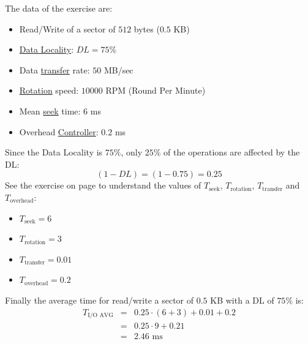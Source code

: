 \begin{exercisebox}
    The data of the exercise are:
    \begin{itemize}
        \item Read/Write of a sector of $512$ bytes ($0.5$ KB)
        \item \underline{Data Locality}: $DL = 75\%$
        \item Data \underline{transfer} rate: $50$ MB/sec
        \item \underline{Rotation} speed: $10000$ RPM (Round Per Minute)
        \item Mean \underline{seek} time: $6$ ms
        \item Overhead \underline{Controller}: $0.2$ ms
    \end{itemize}
    Since the Data Locality is $75\%$, only $25\%$ of the operations are affected by the DL:
    \begin{equation*}
        \left(1-DL\right) = \left(1 - 0.75\right) = 0.25
    \end{equation*}
    See the exercise on page \pageref{exercise: mean service time of an I/O operation} to understand the values of $T_{\text{seek}}$, $T_{\text{rotation}}$, $T_{\text{transfer}}$ and $T_{\text{overhead}}$:
    \begin{itemize}
        \item $T_{\text{seek}} = 6$
        \item $T_{\text{rotation}} = 3$
        \item $T_{\text{transfer}} = 0.01$
        \item $T_{\text{overhead}} = 0.2$
    \end{itemize}
    Finally the average time for read/write a sector of $0.5$ KB with a DL of $75\%$ is:
    \begin{equation*}
        \begin{array}{rcl}
            T_{\text{I/O AVG}} &=& 0.25 \cdot \left(6 + 3\right) + 0.01 + 0.2 \\ [1em]
            &=& 0.25 \cdot 9 + 0.21 \\ [1em]
            &=& 2.46 \text{ ms}
        \end{array}
    \end{equation*}
\end{exercisebox}

